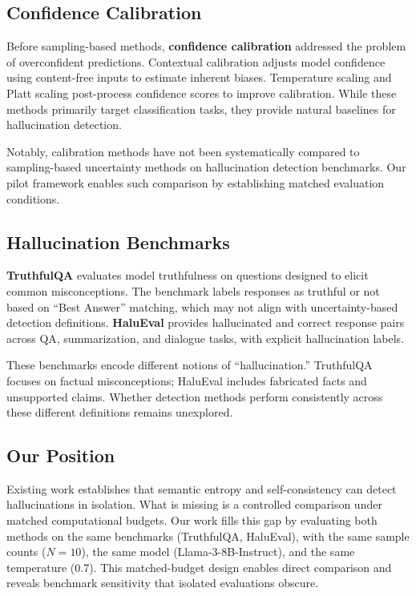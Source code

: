 \subsection{Confidence Calibration}

Before sampling-based methods, \textbf{confidence calibration} addressed the problem of overconfident predictions. Contextual calibration \citep{zhao2021calibrate} adjusts model confidence using content-free inputs to estimate inherent biases. Temperature scaling and Platt scaling \citep{guo2017calibration} post-process confidence scores to improve calibration. While these methods primarily target classification tasks, they provide natural baselines for hallucination detection.

Notably, calibration methods have not been systematically compared to sampling-based uncertainty methods on hallucination detection benchmarks. Our pilot framework enables such comparison by establishing matched evaluation conditions.

\subsection{Hallucination Benchmarks}

\textbf{TruthfulQA} \citep{lin2022truthfulqa} evaluates model truthfulness on questions designed to elicit common misconceptions. The benchmark labels responses as truthful or not based on ``Best Answer'' matching, which may not align with uncertainty-based detection definitions. \textbf{HaluEval} \citep{li2023halueval} provides hallucinated and correct response pairs across QA, summarization, and dialogue tasks, with explicit hallucination labels.

These benchmarks encode different notions of ``hallucination.'' TruthfulQA focuses on factual misconceptions; HaluEval includes fabricated facts and unsupported claims. Whether detection methods perform consistently across these different definitions remains unexplored.

\subsection{Our Position}

Existing work establishes that semantic entropy and self-consistency can detect hallucinations in isolation. What is missing is a controlled comparison under matched computational budgets. Our work fills this gap by evaluating both methods on the same benchmarks (TruthfulQA, HaluEval), with the same sample counts ($N=10$), the same model (Llama-3-8B-Instruct), and the same temperature (0.7). This matched-budget design enables direct comparison and reveals benchmark sensitivity that isolated evaluations obscure.
